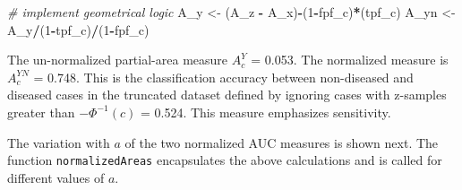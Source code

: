 \documentclass[
]{book}
\newenvironment{Shaded}{\begin{snugshade}}{\end{snugshade}}
\newcommand{\CommentTok}[1]{\textcolor[rgb]{0.56,0.35,0.01}{\textit{#1}}}
\newcommand{\ControlFlowTok}[1]{\textcolor[rgb]{0.13,0.29,0.53}{\textbf{#1}}}
\newcommand{\DataTypeTok}[1]{\textcolor[rgb]{0.13,0.29,0.53}{#1}}
\newcommand{\DecValTok}[1]{\textcolor[rgb]{0.00,0.00,0.81}{#1}}
\newcommand{\FloatTok}[1]{\textcolor[rgb]{0.00,0.00,0.81}{#1}}
\newcommand{\KeywordTok}[1]{\textcolor[rgb]{0.13,0.29,0.53}{\textbf{#1}}}
\newcommand{\NormalTok}[1]{#1}
\newcommand{\OperatorTok}[1]{\textcolor[rgb]{0.81,0.36,0.00}{\textbf{#1}}}
\newcommand{\StringTok}[1]{\textcolor[rgb]{0.31,0.60,0.02}{#1}}
\begin{document}
\begin{Shaded}
\begin{Highlighting}[]
\CommentTok{# implement geometrical logic}
\NormalTok{A_y <-}\StringTok{ }\NormalTok{(A_z }\OperatorTok{-}\StringTok{ }\NormalTok{A_x)}\OperatorTok{-}\NormalTok{(}\DecValTok{1}\OperatorTok{-}\NormalTok{fpf_c)}\OperatorTok{*}\NormalTok{(tpf_c)}
\NormalTok{A_yn <-}\StringTok{ }\NormalTok{A_y}\OperatorTok{/}\NormalTok{(}\DecValTok{1}\OperatorTok{-}\NormalTok{tpf_c)}\OperatorTok{/}\NormalTok{(}\DecValTok{1}\OperatorTok{-}\NormalTok{fpf_c) }
\end{Highlighting}
\end{Shaded}

The un-normalized partial-area measure \(A_c^{Y}\) = 0.053. The normalized measure is \(A_c^{YN}\) = 0.748. This is the classification accuracy between non-diseased and diseased cases in the truncated dataset defined by ignoring cases with z-samples greater than \(-\Phi^{-1}(c)\) = 0.524. This measure emphasizes sensitivity.

The variation with \(a\) of the two normalized AUC measures is shown next. The function \texttt{normalizedAreas} encapsulates the above calculations and is called for different values of \(a\).

\begin{Shaded}
\end{Shaded}
\end{document}
